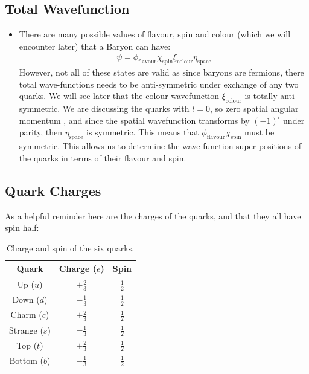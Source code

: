 \documentclass[11pt]{article}
\numberwithin{equation}{section}
\begin{document}
\subsection{Total Wavefunction} %
\label{sub:total_wavefunction}
\begin{itemize}
    \item There are many possible values of flavour, spin and colour (which we will encounter later) that a Baryon can have:
    \begin{align*}
        \psi = \phi_{\text{flavour}}\chi_{\text{spin}}\xi_{\text{colour}}\eta_{\text{space}}
    \end{align*}
    However, not all of these states are valid as since baryons are fermions, there total wave-functions needs to be anti-symmetric under exchange of any two quarks. We will see later that the colour wavefunction $\xi_{\text{colour}}$ is totally anti-symmetric. We are discussing the quarks with $l=0$, so zero spatial angular momentum , and since the spatial wavefunction transforms by $(-1)^l$ under parity, then $\eta_{\text{space}}$ is symmetric. This means that $ \phi_{\text{flavour}}\chi_{\text{spin}}$ must be symmetric. This allows us to determine the wave-function super positions of the quarks in terms of their flavour and spin. 
\end{itemize}
\vspace{40mm    }
\subsection{Quark Charges} %
\label{sub:quark_properties}
As a helpful reminder here are the charges of the quarks, and that they all have spin half:
\begin{table}[H]
    \centering
    \renewcommand{\arraystretch}{1.2}
    \begin{tabular}{|c|c|c|}
        \hline
        Quark & Charge ($e$) & Spin \\
        \hline
        Up ($u$) & $+\frac{2}{3}$ & $\frac{1}{2}$ \\
        Down ($d$) & $-\frac{1}{3}$ & $\frac{1}{2}$ \\
        Charm ($c$) & $+\frac{2}{3}$ & $\frac{1}{2}$ \\
        Strange ($s$) & $-\frac{1}{3}$ & $\frac{1}{2}$ \\
        Top ($t$) & $+\frac{2}{3}$ & $\frac{1}{2}$ \\
        Bottom ($b$) & $-\frac{1}{3}$ & $\frac{1}{2}$ \\
        \hline
    \end{tabular}
    \caption{Charge and spin of the six quarks.}
    \label{tab:quarks}
\end{table}
\end{document}
